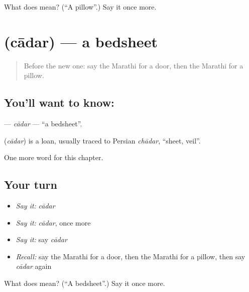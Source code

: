 \begin{tcolorbox}[breakable,colback=teal!4,colframe=teal!35!black,title={Before you move on}]
What does  mean? (\textquotedblleft{}A pillow\textquotedblright{}.) Say it once more.
\end{tcolorbox}
\section[\texorpdfstring{\mr{चादर} (cādar)}{चादर (cādar)}]{ (cādar) — a bedsheet}

\label{lesson:MR-C130-cadar}



\begin{quote}
Before the new one: say the Marathi for a door, then the Marathi for a pillow.
\end{quote}

\subsection*{You'll want to know: }
\textbf{} — \emph{cādar} — \textquotedblleft{}a bedsheet\textquotedblright{}.

\begin{cousinweb}
\textbf{} (\emph{cādar}) is a loan, usually traced to Persian \emph{chādar}, \textquotedblleft{}sheet, veil\textquotedblright{}.
\end{cousinweb}

\begin{grammarlens}[title={What you've built}]
One more word for this chapter.
\end{grammarlens}

\subsection*{Your turn}
\begin{itemize}
\raggedright
  \item \emph{Say it:} \emph{cādar}
  \item \emph{Say it:} \emph{cādar}, once more
  \item \emph{Say it:} say \emph{cādar}
  \item \emph{Recall:} say the Marathi for a door, then the Marathi for a pillow, then say \emph{cādar} again
\end{itemize}

\begin{tcolorbox}[breakable,colback=teal!4,colframe=teal!35!black,title={Before you move on}]
What does  mean? (\textquotedblleft{}A bedsheet\textquotedblright{}.) Say it once more.
\end{tcolorbox}

